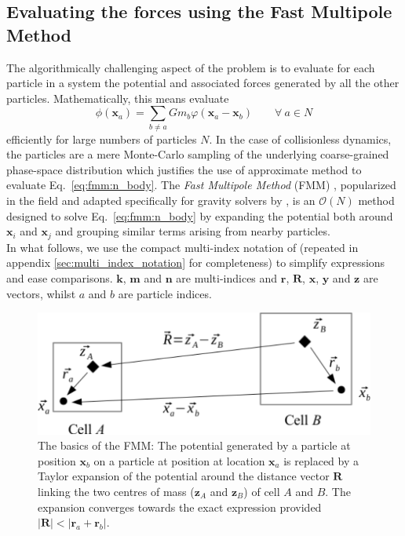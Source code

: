 \subsection{Evaluating the forces using the Fast Multipole Method}
\label{ssec:fmm_summary}

The algorithmically challenging aspect of the \nbody problem is to
evaluate for each particle in a system the potential and associated
forces generated by all the other particles. Mathematically, this means
evaluate
\begin{equation}
  \phi(\mathbf{x}_a) = \sum_{b \neq a} G m_b\varphi(\mathbf{x}_a -
  \mathbf{x}_b)\qquad \forall~a\in N
  \label{eq:fmm:n_body}
\end{equation}
efficiently for large numbers of particles $N$. In the case of collisionless
dynamics, the particles are a mere Monte-Carlo sampling of the
underlying coarse-grained phase-space distribution which justifies the
use of approximate method to evaluate Eq.~\ref{eq:fmm:n_body}. The
\emph{Fast Multipole Method} (FMM) \citep{Greengard1987, Cheng1999},
popularized in the field and adapted specifically for gravity solvers
by \cite{Dehnen2000, Dehnen2002}, is an $\mathcal{O}(N)$ method
designed to solve Eq.~\ref{eq:fmm:n_body} by expanding the potential both
around $\mathbf{x}_i$ and $\mathbf{x}_j$ and grouping similar terms
arising from nearby particles. \\

In what follows, we use the compact multi-index notation of
\cite{Dehnen2014} (repeated in appendix \ref{sec:multi_index_notation}
for completeness) to simplify expressions and ease
comparisons. $\mathbf{k}$, $\mathbf{m}$ and $\mathbf{n}$ are
multi-indices and $\mathbf{r}$, $\mathbf{R}$, $\mathbf{x}$,
$\mathbf{y}$ and $\mathbf{z}$ are vectors, whilst $a$ and $b$ are
particle indices.\\

\begin{figure}
\includegraphics[width=\columnwidth]{cells.pdf}
\caption{The basics of the FMM: The potential generated by a particle
  at position $\mathbf{x}_b$ on a particle at position at location
  $\mathbf{x}_a$ is replaced by a Taylor expansion of the potential
  around the distance vector $\mathbf{R}$ linking the two centres of mass
  ($\mathbf{z}_A$ and $\mathbf{z}_B$) of cell $A$ and $B$. The
  expansion converges towards the exact expression provided
  $|\mathbf{R}|<|\mathbf{r}_a + \mathbf{r}_b|$.}
\label{fig:fmm:cells}
\end{figure}


